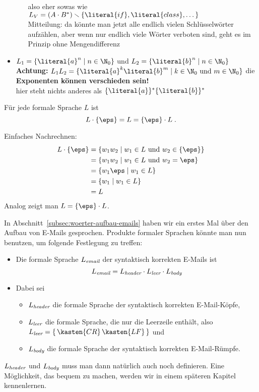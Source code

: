 \begin{tutorium}
\begin{itemize}
\begin{itemize}
      also eher sowas wie $L_V= (A \cdot B^*)
      \smallsetminus\{\literal{if}, \literal{class}, \dots\}$ \\
      Mitteilung: da könnte man jetzt alle endlich vielen Schlüsselwörter
      aufzählen, aber wenn nur endlich viele Wörter verboten sind, geht es im
      Prinzip ohne Mengendifferenz
    \end{itemize}
  \item $L_1=\{\literal{a}^n \mid n\in\N_0\}$ und  $L_2=\{\literal{b}^n \mid n\in\N_0\}$ \\
    \textbf{Achtung:} $L_1L_2=\{\literal{a}^k\literal{b}^m \mid
    k\in\N_0\text{ und } m\in\N_0\}$  die \textbf{Exponenten können verschieden
      sein!} \\
    hier steht nichts anderes als $\{\literal{a}\}^*\{\literal{b}\}^*$
  \end{itemize}
\end{tutorium}
%
\begin{lemma}
  \label{lem:L-eps}
  Für jede formale Sprache $L$ ist 
  \[
  L\cdot\{\eps\} = L = \{\eps\}\cdot L \;.
  \]
\end{lemma}

\begin{beweis}
  Einfaches Nachrechnen:
  \begin{align*}
    L\cdot\{\eps\} &=  \{ w_1 w_2 \mid w_1\in L \text{ und }  w_2\in \{\eps\} \} \\
    &= \{ w_1 w_2 \mid w_1\in L \text{ und }  w_2 =\eps \} \\
    &= \{ w_1\eps  \mid w_1\in L \} \\
    &= \{ w_1 \mid w_1\in L \} \\
    &= L
  \end{align*}
  Analog zeigt man $L = \{\eps\}\cdot L$.
\end{beweis}
%
\def\Lemail{L_{\text{\itshape email}}}
\def\Lheader{L_{\text{\itshape header}}}
\def\Lbody{L_{\text{\itshape body}}}
\def\Lleer{L_{\text{\itshape leer}}}
In Abschnitt~\ref{subsec:woerter-aufbau-emails} haben wir ein erstes Mal über
den Aufbau von E-Mails gesprochen. 
%
Produkte formaler Sprachen könnte man nun benutzen, um folgende Festlegung zu
treffen:
\begin{itemize}
\item Die formale Sprache $\Lemail$ der syntaktisch korrekten E-Mails ist
  \[
  \Lemail = \Lheader \cdot \Lleer \cdot \Lbody
  \]
\item Dabei sei
  \begin{itemize}
  \item $\Lheader$ die formale Sprache der syntaktisch korrekten E-Mail-Köpfe,
  \item $\Lleer$ die formale Sprache, die nur die Leerzeile enthält, also
    $\Lleer=\{\,\kasten{CR}\,\kasten{LF}\,\}$ und
  \item $\Lbody$ die formale Sprache der syntaktisch korrekten E-Mail-Rümpfe.
  \end{itemize}
\end{itemize}
% 
$\Lheader$ und $\Lbody$ muss man dann natürlich auch noch definieren.
%
Eine Möglichkeit, das bequem zu machen, werden wir in einem späteren Kapitel
kennenlernen.

